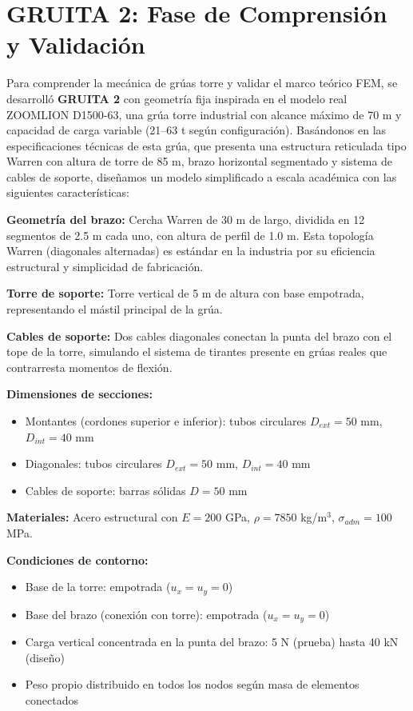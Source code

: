 \documentclass[10pt,a4paper]{article}
\begin{document}
\section{GRUITA 2: Fase de Comprensión y Validación}

Para comprender la mecánica de grúas torre y validar el marco teórico FEM, se desarrolló \textbf{GRUITA 2} con geometría fija inspirada en el modelo real ZOOMLION D1500-63, una grúa torre industrial con alcance máximo de 70 m y capacidad de carga variable (21--63 t según configuración). Basándonos en las especificaciones técnicas de esta grúa, que presenta una estructura reticulada tipo Warren con altura de torre de 85 m, brazo horizontal segmentado y sistema de cables de soporte, diseñamos un modelo simplificado a escala académica con las siguientes características:

\textbf{Geometría del brazo:} Cercha Warren de 30 m de largo, dividida en 12 segmentos de 2.5 m cada uno, con altura de perfil de 1.0 m. Esta topología Warren (diagonales alternadas) es estándar en la industria por su eficiencia estructural y simplicidad de fabricación.

\textbf{Torre de soporte:} Torre vertical de 5 m de altura con base empotrada, representando el mástil principal de la grúa.

\textbf{Cables de soporte:} Dos cables diagonales conectan la punta del brazo con el tope de la torre, simulando el sistema de tirantes presente en grúas reales que contrarresta momentos de flexión.

\textbf{Dimensiones de secciones:}
\begin{itemize}
\item Montantes (cordones superior e inferior): tubos circulares $D_{ext}=50$ mm, $D_{int}=40$ mm
\item Diagonales: tubos circulares $D_{ext}=50$ mm, $D_{int}=40$ mm
\item Cables de soporte: barras sólidas $D=50$ mm
\end{itemize}

\textbf{Materiales:} Acero estructural con $E = 200$ GPa, $\rho = 7850$ kg/m$^3$, $\sigma_{adm} = 100$ MPa.

\textbf{Condiciones de contorno:}
\begin{itemize}
\item Base de la torre: empotrada ($u_x = u_y = 0$)
\item Base del brazo (conexión con torre): empotrada ($u_x = u_y = 0$)
\item Carga vertical concentrada en la punta del brazo: 5 N (prueba) hasta 40 kN (diseño)
\item Peso propio distribuido en todos los nodos según masa de elementos conectados
\end{itemize}
\end{document}
